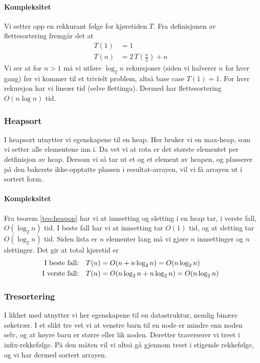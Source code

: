 \paragraph{Kompleksitet} Vi setter opp en rekkurant følge for kjøretiden $ T $. Fra definisjonen av flettesortering fremgår det at
\begin{align*}
T(1) &= 1\\
T(n) &= 2\,T\left( \frac{n}{2} \right) + n
\end{align*}
Vi ser at for $ n>1 $ må vi utføre $ \log_2 n $ rekursjoner (siden vi halverer $ n $ for hver gang) før vi kommer til et trivielt problem, altså base case $ T(1) = 1 $. For hver rekursjon har vi lineær tid (selve flettinga). Dermed har flettesortering $ O(n\log n) $ tid. 



\subsubsection{Heapsort}\label{heapsort}
I heapsort utnytter vi egenskapene til en heap.
Her bruker vi en max-heap, som vi setter alle elementene inn i. Da vet vi at
rota er det største elementet per detfinisjon av heap. Dersom vi så tar ut et og
et element av heapen, og plasserer på den bakerste ikke-opptatte plassen i
resultat-arrayen, vil vi få arrayen ut i sortert form.

\paragraph{Kompleksitet}
Fra teorem \ref{teo:heapop} har vi at innsetting og sletting i en heap tar, i verste fall, $ O(\log_2 n) $ tid. I beste fall har vi at innsetting tar $ O(1) $ tid, og at sletting tar $ O(\log_2 n) $ tid. Siden lista er $ n $ elementer lang må vi gjøre $ n $ innsettinger og $ n $ slettinger. Det gir at total kjøretid er
\begin{align*}
\text{I beste fall:\quad} & T(n) = O(n + n\log_2 n) = O(n\log_2 n)\\
\text{I verste fall:\quad} & T(n) = O(n\log_2 n + n\log_2 n) = O(n\log_2 n)
\end{align*}

\subsubsection{Tresortering}\label{treesort}
I likhet med  utnytter vi her egenskapene til en datastruktur,
nemlig binære søketrær. I et slikt tre vet vi at venstre barn til en node er
mindre enn noden selv, og at høyre barn er større eller lik noden.
Deretter traverserer vi treet i infix-rekkefølge. På den måten vil vi altså gå
gjennom treet i stigende rekkefølge, og vi har dermed sortert arrayen.

